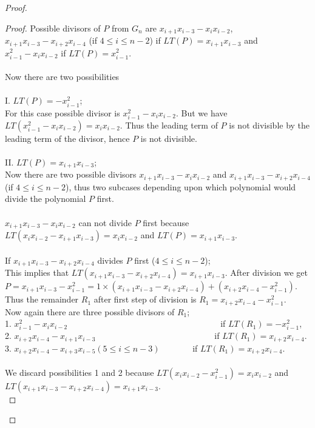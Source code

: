 \documentclass[12pt,a4paper]{article}
\theoremstyle{definition}
\begin{document}
\begin{proof}
\begin{proof}
Possible divisors of $P$ from $G_n$ are $x_{i+1}x_{i-3}-x_{i}x_{i-2}$, $x_{i+1}x_{i-3}-x_{i+2}x_{i-4}$ (if $4 \leq i \leq n-2$) if $LT(P)=x_{i+1}x_{i-3}$ and $x_{i-1}^2-x_{i}x_{i-2}$ if $LT(P) = x_{i-1}^2$.\\
\\
Now there are two possibilities\\
\\
I. $LT(P)=-x_{i-1}^2$;\\ For this case possible divisor is $x_{i-1}^2-x_{i}x_{i-2}$. But we have $LT(x_{i-1}^2-x_{i}x_{i-2}) = x_{i}x_{i-2}$. Thus the leading term of $P$ is not divisible by the leading term of the divisor, hence $P$ is not divisible.\\
\\
II. $LT(P) = x_{i+1}x_{i-3}$;\\
Now there are two possible divisors $x_{i+1}x_{i-3}-x_{i}x_{i-2}$ and $x_{i+1}x_{i-3}-x_{i+2}x_{i-4}$ (if $4 \leq i \leq n-2$), thus two subcases depending upon which polynomial would divide the polynomial $P$ first.\\
\\
$x_{i+1}x_{i-3}-x_{i}x_{i-2}$ can not divide $P$ first because $LT(x_{i}x_{i-2}-x_{i+1}x_{i-3}) = x_{i}x_{i-2}$ and $LT(P) = x_{i+1}x_{i-3}$.\\
\\
If $x_{i+1}x_{i-3}-x_{i+2}x_{i-4}$ divides $P$ first ($4 \leq i \leq n-2$);\\  This implies that $LT(x_{i+1}x_{i-3}-x_{i+2}x_{i-4}) = x_{i+1}x_{i-3}$. After division we get\\
$P = x_{i+1}x_{i-3}-x_{i-1}^2 = 1\times (x_{i+1}x_{i-3}-x_{i+2}x_{i-4}) + (x_{i+2}x_{i-4}-x_{i-1}^2)$.\\
Thus the remainder $R_1$ after first step of division is $R_1=x_{i+2}x_{i-4}-x_{i-1}^2$.\\
Now again there are three possible divisors of $R_1$;\\ 1. $x_{i-1}^2-x_{i}x_{i-2}$\ \ \ \ \ \ \ \ \ \ \ \ \ \ \ \ \ \ \ \ \ \ \ \ \ \ \ \ \ \ \ \ \ \ \ \  if $LT(R_1)=-x_{i-1}^2$,\\2. $x_{i+2}x_{i-4}-x_{i+1}x_{i-3}$\ \ \ \  \ \ \ \ \  \ \ \ \ \ \ \ \ \ \ \ \  \ \ \  \ \  \ \ if $LT(R_1)=x_{i+2}x_{i-4}$.\\3. $ x_{i+2}x_{i-4}-x_{i+3}x_{i-5}(5 \leq i \leq n-3)$  \ \ \ \  \ \ \ if $LT(R_1)=x_{i+2}x_{i-4}$.  
\\
\\
We discard possibilities 1 and 2 because $LT(x_{i}x_{i-2}-x_{i-1}^2) = x_{i}x_{i-2}$ and $LT(x_{i+1}x_{i-3}-x_{i+2}x_{i-4}) = x_{i+1}x_{i-3}$.\\

\end{proof}
\end{proof}
\end{document}
